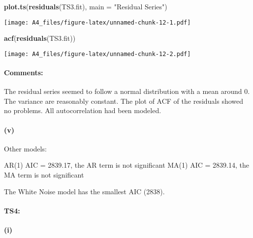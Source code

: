 \documentclass[]{article}
\newenvironment{Shaded}{\begin{snugshade}}{\end{snugshade}}
\newcommand{\DataTypeTok}[1]{\textcolor[rgb]{0.13,0.29,0.53}{#1}}
\newcommand{\KeywordTok}[1]{\textcolor[rgb]{0.13,0.29,0.53}{\textbf{#1}}}
\newcommand{\NormalTok}[1]{#1}
\newcommand{\OperatorTok}[1]{\textcolor[rgb]{0.81,0.36,0.00}{\textbf{#1}}}
\newcommand{\StringTok}[1]{\textcolor[rgb]{0.31,0.60,0.02}{#1}}
\let\oldparagraph\paragraph
\renewcommand{\paragraph}[1]{\oldparagraph{#1}\mbox{}}
\begin{document}
\begin{Shaded}
\begin{Highlighting}[]
\KeywordTok{plot.ts}\NormalTok{(}\KeywordTok{residuals}\NormalTok{(TS3.fit), }\DataTypeTok{main =} \StringTok{"Residual Series"}\NormalTok{)}
\end{Highlighting}
\end{Shaded}

\texttt{[image: A4\_files/figure-latex/unnamed-chunk-12-1.pdf]}

\begin{Shaded}
\begin{Highlighting}[]
\KeywordTok{acf}\NormalTok{(}\KeywordTok{residuals}\NormalTok{(TS3.fit))}
\end{Highlighting}
\end{Shaded}

\texttt{[image: A4\_files/figure-latex/unnamed-chunk-12-2.pdf]}

\hypertarget{comments-3}{%
\paragraph{Comments:}\label{comments-3}}

The residual series seemed to follow a normal distribution with a mean
around 0. The variance are reasonably constant. The plot of ACF of the
residuals showed no problems. All autocorrelation had been modeled.

\hypertarget{v-2}{%
\paragraph{(v)}\label{v-2}}

Other models:

AR(1) AIC = 2839.17, the AR term is not significant MA(1) AIC = 2839.14,
the MA term is not significant

The White Noise model has the smallest AIC (2838).

\hypertarget{ts4}{%
\paragraph{TS4:}\label{ts4}}

\hypertarget{i-3}{%
\paragraph{(i)}\label{i-3}}

\begin{Shaded}
\end{Shaded}
\end{document}
